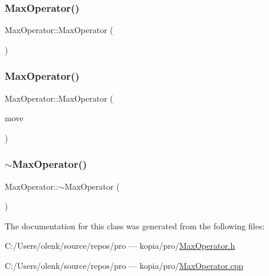 \subsubsection{\texorpdfstring{MaxOperator()}{MaxOperator()}\hspace{0.1cm}{\footnotesize\ttfamily [1/2]}}
{\footnotesize\ttfamily Max\+Operator\+::\+Max\+Operator (\begin{DoxyParamCaption}{ }\end{DoxyParamCaption})}

\mbox{\label{class_max_operator_a0c417f48301b6dd666a758136c3b24b9}} 
\subsubsection{\texorpdfstring{MaxOperator()}{MaxOperator()}\hspace{0.1cm}{\footnotesize\ttfamily [2/2]}}
{\footnotesize\ttfamily Max\+Operator\+::\+Max\+Operator (\begin{DoxyParamCaption}\item[{\mbox{\hyperlink{class_max_operator}{Max\+Operator}} \&\&}]{move }\end{DoxyParamCaption})}

\mbox{\label{class_max_operator_a4e13979accc1c316f797ce9a509e7cdd}} 
\subsubsection{\texorpdfstring{$\sim$MaxOperator()}{~MaxOperator()}}
{\footnotesize\ttfamily Max\+Operator\+::$\sim$\+Max\+Operator (\begin{DoxyParamCaption}{ }\end{DoxyParamCaption})}



The documentation for this class was generated from the following files\+:\begin{DoxyCompactItemize}
\item 
C\+:/\+Users/olenk/source/repos/pro — kopia/pro/\mbox{\hyperlink{_max_operator_8h}{Max\+Operator.\+h}}\item 
C\+:/\+Users/olenk/source/repos/pro — kopia/pro/\mbox{\hyperlink{_max_operator_8cpp}{Max\+Operator.\+cpp}}\end{DoxyCompactItemize}
